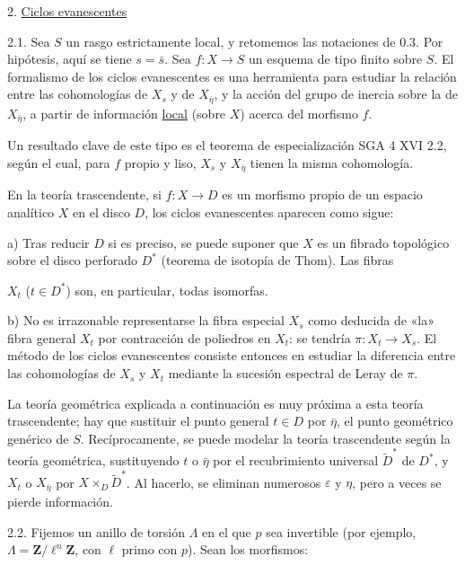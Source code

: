 2. \underline{Ciclos evanescentes}

2.1.    Sea $S$ un rasgo estrictamente local, y retomemos las notaciones de 0.3. Por hipótesis, aquí se tiene $s = \bar{s}$. Sea $f : X \longrightarrow S$ un esquema de tipo finito sobre $S$. El formalismo de los ciclos evanescentes es una herramienta para estudiar la relación entre las cohomologías de $X_s$ y de $X_{\bar{\eta}}$, y la acción del grupo de inercia sobre la de $X_{\bar{\eta}}$, a partir de información \underline{local} (sobre $X$) acerca del morfismo $f$.

Un resultado clave de este tipo es el teorema de especialización SGA 4 XVI 2.2, según el cual, para $f$ propio y liso, $X_s$ y $X_{\bar{\eta}}$ tienen la misma cohomología.

En la teoría trascendente, si $f : X \longrightarrow D$ es un morfismo propio de un espacio analítico $X$ en el disco $D$, los ciclos evanescentes aparecen como sigue:

a) Tras reducir $D$ si es preciso, se puede suponer que $X$ es un fibrado topológico sobre el disco perforado $D^{*}$ (teorema de isotopía de Thom). Las fibras



$X_t$ ($t \in D^{*}$) son, en particular, todas isomorfas.

b) No es irrazonable representarse la fibra especial $X_s$ como deducida de «la» fibra general $X_t$ por contracción de poliedros en $X_t$: se tendría $\pi : X_t \longrightarrow X_s$. El método de los ciclos evanescentes consiste entonces en estudiar la diferencia entre las cohomologías de $X_s$ y $X_t$ mediante la sucesión espectral de Leray de $\pi$.

La teoría geométrica explicada a continuación es muy próxima a esta teoría trascendente; hay que sustituir el punto general $t \in D$ por $\bar{\eta}$, el punto geométrico genérico de $S$. Recíprocamente, se puede modelar la teoría trascendente según la teoría geométrica, sustituyendo $t$ o $\bar{\eta}$ por el recubrimiento universal $\widetilde{D}^{*}$ de $D^{*}$, y $X_t$ o $X_{\bar{\eta}}$ por $X \times_D \widetilde{D}^{*}$. Al hacerlo, se eliminan numerosos $\varepsilon$ y $\eta$, pero a veces se pierde información.

2.2. Fijemos un anillo de torsión $\Lambda$ en el que $p$ sea invertible (por ejemplo, $\Lambda = \mathbf{Z}/\ell^n\mathbf{Z}$, con $\ell$ primo con $p$). Sean los morfismos:

